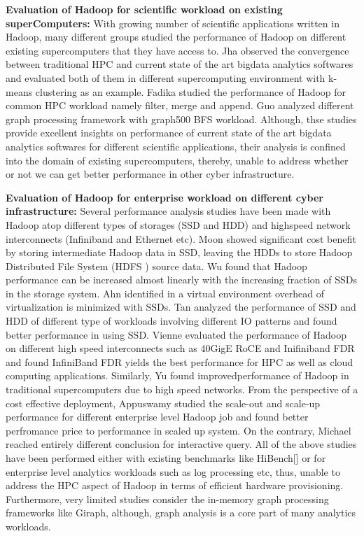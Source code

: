 \textbf{Evaluation of Hadoop for scientific workload on existing superComputers:}
With growing number of scientific applications written in Hadoop, many different groups studied the performance of Hadoop on different existing supercomputers that they have access to.
Jha \cite{schadoop:jha} observed the convergence between traditional HPC and current state of the art bigdata analytics softwares and evaluated both of them in different supercomputing environment with k-means clustering as an example.
Fadika \cite{schadoop:fadika} studied the performance of Hadoop for common HPC workload namely filter, merge and append.
Guo \cite{scgraph:guo} analyzed different graph processing framework with graph500 \cite{bm:graph500} BFS workload.
Although, thse studies provide excellent insights on performance of current state of the art bigdata analytics softwares for different scientific applications, their analysis is confined into the domain of existing supercomputers, thereby, unable to address whether or not we can get better performance in other cyber infrastructure.

\textbf{Evaluation of Hadoop for enterprise workload on different cyber infrastructure:}
Several performance analysis studies have been made with Hadoop atop different types of storages (SSD and HDD) and highspeed network interconnects (Infiniband and Ethernet etc).
Moon \cite{ssdhdd:moon} showed significant cost benefit by storing intermediate Hadoop data in SSD, leaving the HDDs to store Hadoop Distributed File System (HDFS \cite{fw:hdfs}) source data.
Wu \cite{ssdhdd:wu} found that Hadoop performance can be increased almost linearly with the increasing fraction of SSDs in the storage system.
Ahn \cite{ssdhdd:ahn} identified in a virtual environment overhead of virtualization is minimized with SSDs.
Tan \cite{ssdhdd:tan} analyzed the performance of SSD and HDD of different type of workloads involving different IO patterns and found better performance in using SSD.
Vienne \cite{ethib:vienne} evaluated the performance of Hadoop on different high speed interconnects such as 40GigE RoCE and Inifiniband FDR and found InfiniBand FDR yields the best performance for HPC as well as cloud computing applications.
Similarly, Yu \cite{ethib:yu} found improvedperformance of Hadoop in traditional supercomputers due to high speed networks.
From the perspective of a cost effective deployment, Appuswamy \cite{scaleupscaleout:appuswamy} studied the scale-out and scale-up performance for different enterprise level Hadoop job and found better perfromance price to performance in scaled up system.
On the contrary, Michael \cite{scaleupscaleout:michael} reached entirely different conclusion for interactive query.
All of the above studies have been performed either with existing benchmarks like HiBench[] or for enterprise level analytics workloads such as log processing etc, thus, unable to address the HPC aspect of Hadoop in terms of efficient hardware provisioning.
Furthermore, very limited studies consider the in-memory graph processing frameworks like Giraph, although, graph analysis is a core part of many analytics workloads.     

